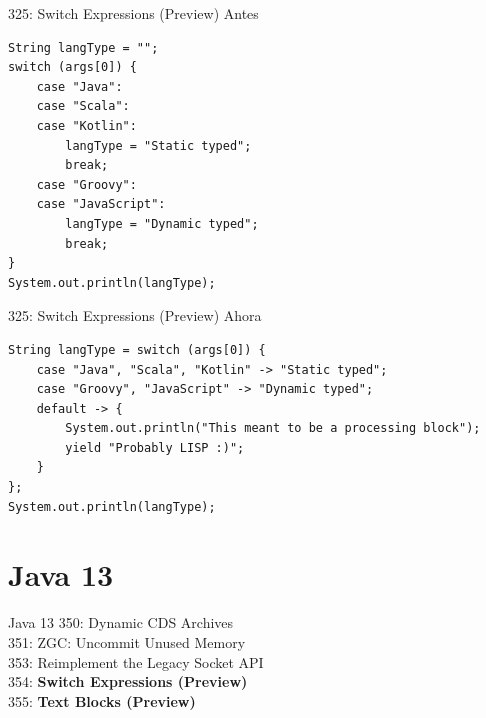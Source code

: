 \documentclass[aspectratio=169]{beamer}
\begin{document}
\begin{frame}[fragile]{325: Switch Expressions (Preview)}
Antes
\begin{lstlisting}
String langType = "";
switch (args[0]) {
    case "Java":
    case "Scala":
    case "Kotlin":
        langType = "Static typed";
        break;
    case "Groovy":
    case "JavaScript":
        langType = "Dynamic typed";
        break;
}
System.out.println(langType);
\end{lstlisting}	
\end{frame}

\begin{frame}[fragile]{325: Switch Expressions (Preview)}
Ahora
\begin{lstlisting}
String langType = switch (args[0]) {
    case "Java", "Scala", "Kotlin" -> "Static typed";
    case "Groovy", "JavaScript" -> "Dynamic typed";
    default -> {
        System.out.println("This meant to be a processing block");
        yield "Probably LISP :)";
    }
};
System.out.println(langType);
\end{lstlisting}	
\end{frame}

{
    \section{Java 13}
}

\begin{frame}[fragile]{Java 13}
350: Dynamic CDS Archives\\
351: ZGC: Uncommit Unused Memory\\
353: Reimplement the Legacy Socket API\\
354: \textbf{Switch Expressions (Preview)}\\
355: \textbf{Text Blocks (Preview)}\\
\end{frame}
\end{document}
